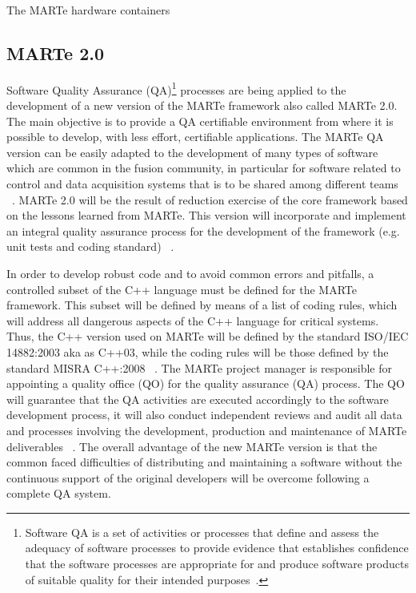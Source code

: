 The MARTe hardware containers 


\subsection{MARTe 2.0}
Software Quality Assurance (QA)\footnote{Software QA is a set of activities or processes that define and assess the adequacy of software processes to provide evidence that establishes confidence that the software processes are appropriate for and produce software products of suitable quality for their intended purposes~\cite[Chapter 5.1]{SQA}.} processes are being applied to the development of a new version of the MARTe framework also  called MARTe 2.0. The main objective is to provide a QA certifiable environment from where it is possible to develop, with less effort, certifiable applications. The  MARTe QA version can be easily adapted to the development of many types of software which are common in the fusion community, in particular for software related to control and data acquisition systems that is to be shared among different teams  ~\cite{MARTe2}. MARTe 2.0 will be the result of reduction exercise of the core framework based on the lessons learned from MARTe. This version will incorporate and implement an integral quality assurance process for the development of the framework (e.g. unit tests and coding standard) ~\cite{MARTe2PMP}. 
\smallskip

In order to develop robust code and to avoid common errors and pitfalls, a controlled subset of the C++ language must be defined for the MARTe framework. This subset will be defined by means of a list of coding rules, which will address all dangerous aspects of the C++ language for critical systems. Thus, the C++ version used on MARTe will be defined by the standard ISO/IEC 14882:2003 aka as C++03, while the coding rules will be those defined by the standard MISRA C++:2008 ~\cite{MARTe2Code}. The MARTe project manager is responsible for appointing a quality office (QO) for the quality assurance (QA) process. The QO will guarantee that the QA activities are executed accordingly to the software development process, it will also conduct independent reviews and audit all data and processes involving the development, production and maintenance of MARTe deliverables ~\cite{MARTe2QAP}. The overall advantage of the new MARTe version is that the common faced difficulties of distributing and maintaining a software without  the continuous support of the original developers will be overcome following a complete QA system.



